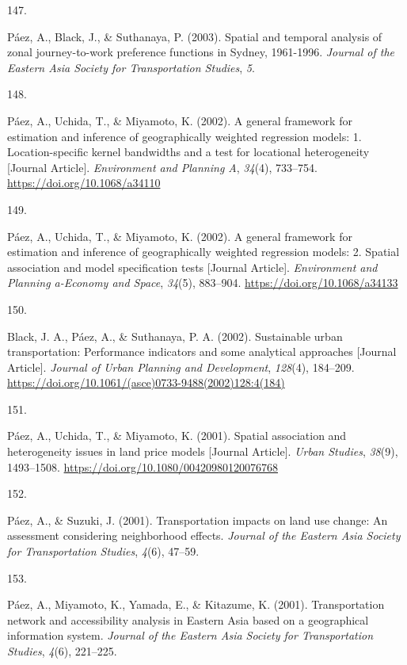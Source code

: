\documentclass[11pt,a4paper,]{awesome-cv}
\newlength{\cslhangindent}
\newlength{\csllabelwidth}
\newenvironment{CSLReferences}[2] %
 {\begin{list}{}{%
  \setlength{\itemindent}{0pt}
  \setlength{\leftmargin}{0pt}
  \setlength{\parsep}{0pt}
  \ifodd #1
   \setlength{\leftmargin}{\cslhangindent}
   \setlength{\itemindent}{-1\cslhangindent}
  \fi
  \setlength{\itemsep}{#2\baselineskip}}}
 {\end{list}}
\newcommand{\CSLLeftMargin}[1]{\parbox[t]{\csllabelwidth}{\strut#1\strut}}
\newcommand{\CSLRightInline}[1]{\parbox[t]{\linewidth - \csllabelwidth}{\strut#1\strut}}
\begin{document}
\begin{CSLReferences}{0}{0}
\CSLLeftMargin{147. }%
\CSLRightInline{Páez, A., Black, J., \& Suthanaya, P. (2003). Spatial
and temporal analysis of zonal journey-to-work preference functions in
Sydney, 1961-1996. \emph{Journal of the Eastern Asia Society for
Transportation Studies}, \emph{5}.}

\CSLLeftMargin{148. }%
\CSLRightInline{Páez, A., Uchida, T., \& Miyamoto, K. (2002). A general
framework for estimation and inference of geographically weighted
regression models: 1. Location-specific kernel bandwidths and a test for
locational heterogeneity {[}Journal Article{]}. \emph{Environment and
Planning A}, \emph{34}(4), 733--754.
\url{https://doi.org/10.1068/a34110}}

\CSLLeftMargin{149. }%
\CSLRightInline{Páez, A., Uchida, T., \& Miyamoto, K. (2002). A general
framework for estimation and inference of geographically weighted
regression models: 2. Spatial association and model specification tests
{[}Journal Article{]}. \emph{Environment and Planning a-Economy and
Space}, \emph{34}(5), 883--904. \url{https://doi.org/10.1068/a34133}}

\CSLLeftMargin{150. }%
\CSLRightInline{Black, J. A., Páez, A., \& Suthanaya, P. A. (2002).
Sustainable urban transportation: Performance indicators and some
analytical approaches {[}Journal Article{]}. \emph{Journal of Urban
Planning and Development}, \emph{128}(4), 184--209.
\url{https://doi.org/10.1061/(asce)0733-9488(2002)128:4(184)}}

\CSLLeftMargin{151. }%
\CSLRightInline{Páez, A., Uchida, T., \& Miyamoto, K. (2001). Spatial
association and heterogeneity issues in land price models {[}Journal
Article{]}. \emph{Urban Studies}, \emph{38}(9), 1493--1508.
\url{https://doi.org/10.1080/00420980120076768}}

\CSLLeftMargin{152. }%
\CSLRightInline{Páez, A., \& Suzuki, J. (2001). Transportation impacts
on land use change: An assessment considering neighborhood effects.
\emph{Journal of the Eastern Asia Society for Transportation Studies},
\emph{4}(6), 47--59.}

\CSLLeftMargin{153. }%
\CSLRightInline{Páez, A., Miyamoto, K., Yamada, E., \& Kitazume, K.
(2001). Transportation network and accessibility analysis in Eastern
Asia based on a geographical information system. \emph{Journal of the
Eastern Asia Society for Transportation Studies}, \emph{4}(6),
221--225.}


\end{CSLReferences}
\end{document}

